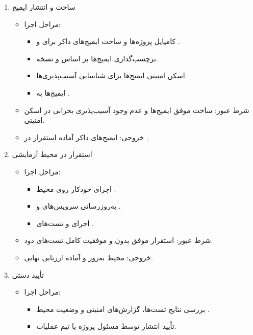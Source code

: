 \begin{enumerate}[label=\arabic*.]
    \item {ساخت و انتشار ایمیج}
    \begin{itemize}
        \item {مراحل اجرا:}
        \begin{itemize}
            \item کامپایل پروژه‌ها و ساخت ایمیج‌های داکر برای  و .
            \item برچسب‌گذاری ایمیج‌ها بر اساس  و نسخه.
            \item اسکن امنیتی ایمیج‌ها برای شناسایی آسیب‌پذیری‌ها.
            \item {} ایمیج‌ها به .
        \end{itemize}

        \item {شرط عبور:}
        ساخت موفق ایمیج‌ها و عدم وجود آسیب‌پذیری بحرانی در اسکن امنیتی.

        \item {خروجی:}
        ایمیج‌های داکر آماده استقرار در .
    \end{itemize}

    \item {استقرار در محیط آزمایشی}
    \begin{itemize}
        \item {مراحل اجرا:}
        \begin{itemize}
            \item اجرای خودکار  روی محیط .
            \item به‌روزرسانی سرویس‌های  و .
            \item اجرای  و تست‌های .
        \end{itemize}

        \item {شرط عبور:}
        استقرار موفق بدون  و موفقیت کامل تست‌های دود.

        \item {خروجی:}
        محیط  به‌روز و آماده ارزیابی نهایی.
    \end{itemize}

    \item {تأیید دستی}
    \begin{itemize}
        \item {مراحل اجرا:}
        \begin{itemize}
            \item بررسی نتایج تست‌ها، گزارش‌های امنیتی و وضعیت محیط .
            \item تأیید انتشار توسط مسئول پروژه یا تیم عملیات.
        \end{itemize}


\end{itemize}
\end{enumerate}

